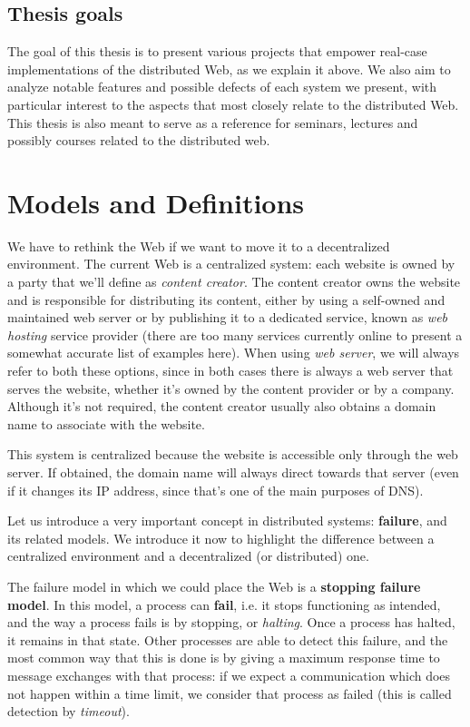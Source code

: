 \documentclass[mscthesis]{usiinfthesis}
\begin{document}
\section{Thesis goals}
The goal of this thesis is to present various projects that empower real-case implementations of the distributed Web, as we explain it above. We also aim to analyze notable features and possible defects of each system we present, with particular interest to the aspects that most closely relate to the distributed Web. This thesis is also meant to serve as a reference for seminars, lectures and possibly courses related to the distributed web. %

\chapter{Models and Definitions}
\label{ch:background}

We have to rethink the Web if we want to move it to a decentralized environment. The current Web is a centralized system: each website is owned by a party that we'll define as \textit{content creator}. The content creator owns the website and is responsible for distributing its content, either by using a self-owned and maintained web server or by publishing it to a dedicated service, known as \textit{web hosting} service provider (there are too many services currently online to present a somewhat accurate list of examples here). When using \textit{web server}, we will always refer to both these options, since in both cases there is always a web server that serves the website, whether it's owned by the content provider or by a company.
Although it's not required, the content creator usually also obtains a domain name to associate with the website.

This system is centralized because the website is accessible only through the web server. If obtained, the domain name will always direct towards that server (even if it changes its IP address, since that's one of the main purposes of DNS).

Let us introduce a very important concept in distributed systems: \textbf{failure}, and its related models.
We introduce it now to highlight the difference between a centralized environment and a decentralized (or distributed) one.

The failure model in which we could place the Web is a \textbf{stopping failure model}.
In this model, a process can \textbf{fail}, i.e. it stops functioning as intended, and the way a process fails is by stopping, or \textit{halting}. Once a process has halted, it remains in that state. Other processes are able to detect this failure, and the most common way that this is done is by giving a maximum response time to message exchanges with that process: if we expect a communication which does not happen within a time limit, we consider that process as failed (this is called detection by \textit{timeout}).
\end{document}
